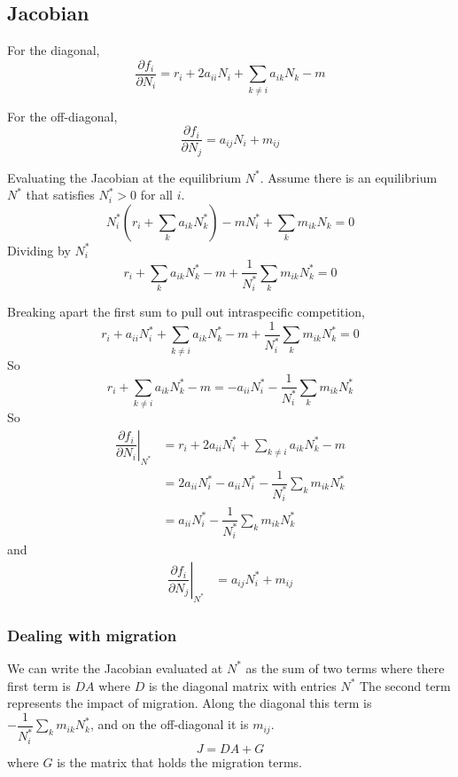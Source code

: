 \documentclass{article}
\begin{document}
\subsection*{Jacobian}
For the diagonal,
\begin{equation}
\dfrac{\partial f_i}{\partial N_i} = r_i + 2a_{ii}N_i + \sum_{k \neq i} a_{ik}N_k - m 
\end{equation}

For the off-diagonal,
\begin{equation}
\dfrac{\partial f_i}{\partial N_j} = a_{ij} N_i + m_{ij}
\end{equation}

Evaluating the Jacobian at the equilibrium $N^*$. Assume there is an equilibrium $N^*$ that satisfies $N^*_i>0$ for all $i$.
\begin{equation}
    N^*_i\left(r_i+\sum_k a_{ik}N^*_k\right)-mN^*_i+\sum_k m_{ik}N_k=0
\end{equation}
Dividing by $N_i^*$
\begin{equation}
r_i+\sum_k a_{ik}N^*_k-m+\dfrac{1}{N^*_i}\sum_k m_{ik}N^*_k=0
\end{equation}

Breaking apart the first sum to pull out intraspecific competition,
\begin{equation}
    r_i+a_{ii}N_i^* + \sum_{k \neq i} a_{ik}N^*_k-m+\dfrac{1}{N^*_i}\sum_k m_{ik}N^*_k=0
\end{equation}
So
\begin{equation}
    r_i+\sum_{k \neq i} a_{ik}N^*_k-m=-a_{ii}N_i^* - \dfrac{1}{N^*_i}\sum_k m_{ik}N^*_k
\end{equation}
So
\begin{align}
    \left.\dfrac{\partial f_i}{\partial N_i} \right \rvert_{N^*} 
    &= r_i + 2a_{ii} N^*_i + \sum_{k\neq i} a_{ik}N^*_k - m \\
    &= 2a_{ii}N^*_i-a_{ii}N_i^* - \dfrac{1}{N^*_i}\sum_k m_{ik}N^*_k \\
    &= a_{ii}N^*_i - \dfrac{1}{N^*_i}\sum_k m_{ik}N^*_k
\end{align}
and
\begin{align}
    \left.\dfrac{\partial f_i}{\partial N_j} \right \rvert_{N^*} 
    &= a_{ij} N^*_i + m_{ij}
\end{align}

\subsubsection*{Dealing with migration}
We can write the Jacobian evaluated at $N^*$ as the sum of two terms where there first term is $D A$ where $D$ is the diagonal matrix with entries $N^*$ The second term represents the impact of migration. Along the diagonal this term is $- \dfrac{1}{N^*_i}\sum_k m_{ik}N^*_k$, and on the off-diagonal it is $m_{ij}$.
\begin{equation}
J = DA + G
\end{equation}
where $G$ is the matrix that holds the migration terms.
\end{document}
